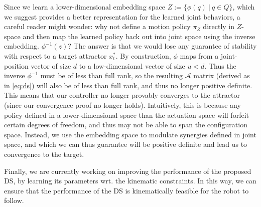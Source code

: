 \documentclass[letterpaper, 10 pt, conference,fleqn]{ieeeconf}
\begin{document}
Since we learn a lower-dimensional embedding space $Z := \{\phi(q) ~|~q \in Q\}$, which we suggest provides a better representation for the learned joint behaviors, a careful reader might wonder: why not define a motion policy $\pi_Z$ directly in $Z$-space and then map the learned policy back out into joint space using the inverse embedding. $\phi^{-1}(z)$? The answer is that we would lose any guarantee of stability with respect to a target attractor $x_t^*$. By construction, $\phi$ maps from a joint-position vector of size $d$ to a low-dimensional vector of size $u<d$. Thus the inverse $\phi^{-1}$ must be of less than full rank, so the resulting $\mathcal{A}$ matrix (derived as in \eqref{eq:ds}) will also be of less than full rank, and thus no longer positive definite. This means that our controller no longer provably converges to the attractor (since our convergence proof no longer holds). Intuitively, this is because any policy defined in a lower-dimensional space than the actuation space will forfeit certain degrees of freedom, and thus may not be able to span the configuration space. Instead, we use the embedding space to modulate synergies defined in joint space, and which we can thus guarantee will be positive definite and lead us to convergence to the target.

Finally,  we are currently working on improving the performance of the proposed DS, by learning its parameters wrt. the kinematic constraints. In this way, we can ensure that the performance of the DS is kinematically feasible for the robot to  follow.
\end{document}
